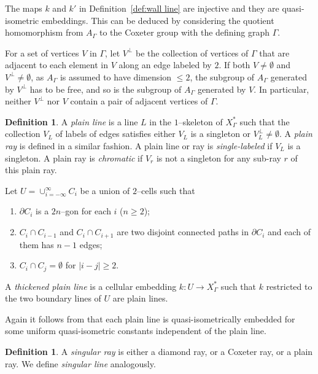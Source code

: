 \documentclass[11pt]{amsart}
\theoremstyle{definition}
\newtheorem{definition}[theorem]{Definition}
\newcommand{\Xa}{X^{\ast}}
\begin{document}
The maps $k$ and $k'$ in Definition~\ref{def:wall line} are injective and they are quasi-isometric embeddings. This can be deduced by considering the quotient homomorphism from $A_\Gamma$ to the Coxeter group with the defining graph $\Gamma$. 

For a set of vertices $V$ in $\Gamma$, let $V^{\perp}$ be the collection of vertices of $\Gamma$ that are adjacent to each element in $V$ along an edge labeled by $2$. If both $V\neq\emptyset$ and  $V^{\perp}\neq\emptyset$, as $A_\Gamma$ is assumed to have dimension $\le 2$, the subgroup of $A_\Gamma$ generated by $V^\perp$ has to be free, and so is the subgroup of $A_\Gamma$ generated by $V$. In particular, neither $V^{\perp}$ nor $V$ contain a pair of adjacent vertices of $\Gamma$.

\begin{definition}
	\label{def:plain line}
A \emph{plain line} is a line $L$ in the $1$--skeleton of $\Xa_\Gamma$ such that the collection $V_L$ of labels of edges satisfies either $V_L$ is a singleton or $V^{\perp}_L\neq\emptyset$.
A \emph{plain ray} is defined in a similar fashion. A plain line or ray is \emph{single-labeled} if $V_L$ is a singleton. A plain ray is \emph{chromatic} if $V_r$ is not a singleton for any sub-ray $r$ of this plain ray.

Let $U=\cup_{i=-\infty}^{\infty}C_i$ be a union of $2$--cells such that 
\begin{enumerate}
	\item $\partial C_i$ is a $2n$--gon for each $i$ ($n\ge 2$);
	\item $C_i\cap C_{i-1}$ and $C_i\cap C_{i+1}$ are two disjoint connected paths in $\partial C_i$ and each of them has $n-1$ edges;
	\item $C_i\cap C_j=\emptyset$ for $|i-j|\ge 2$.
\end{enumerate}
A \emph{thickened plain line} is a cellular embedding $k\colon U\to\Xa_\Gamma$ such that $k$ restricted to the two boundary lines of $U$ are plain lines.
\end{definition}
Again it follows from \cite[Theorem 1.2]{charney2014convexity} that each plain line is quasi-isometrically embedded for some uniform quasi-isometric constants independent of the plain line.

\begin{definition}
A \emph{singular ray} is either a diamond ray, or a Coxeter ray, or a plain ray. We define \emph{singular line} analogously.
\end{definition}
\end{document}
